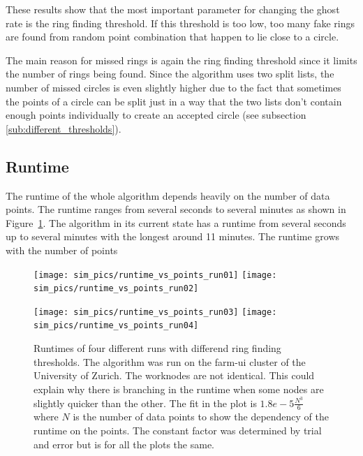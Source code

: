 \documentclass[11pt]{scrreprt}
\begin{document}
These results show that the most important parameter for changing the ghost rate is the ring finding threshold.
If this threshold is too low, too many fake rings are found from random point combination that happen to lie close to a circle.

The main reason for missed rings is again the ring finding threshold since it limits the number of rings
being found. Since the algorithm uses two split lists, the number of missed circles is even slightly higher due to the
fact that sometimes the points of a circle can be split just in a way that the two lists don't
contain enough points individually to create an accepted circle (see subsection \ref{sub:different_thresholds}).
\subsection{Runtime} %
\label{sub:runtime}

The runtime of the whole algorithm depends heavily on the number of data points. The runtime ranges from several seconds to 
several minutes as shown in Figure~\ref{fig:runtime}. The algorithm in its current state has a runtime from several seconds up
to several minutes with the longest around 11 minutes. The runtime grows with the number of points

\begin{figure}[tb]
  \centering
  \texttt{[image: sim\_pics/runtime\_vs\_points\_run01]}%
  \texttt{[image: sim\_pics/runtime\_vs\_points\_run02]}

  \texttt{[image: sim\_pics/runtime\_vs\_points\_run03]}%
  \texttt{[image: sim\_pics/runtime\_vs\_points\_run04]}
  \caption[Runtimes of four different runs]{Runtimes of four different runs with differend ring finding thresholds. The algorithm was run on the farm-ui cluster of the
  University of Zurich. The worknodes are not identical. This could explain why there is branching in the runtime when some 
  nodes are slightly quicker than the other. The fit in the plot is $1.8e{-}5\frac{N^3}{6}$ where $N$ is the number of data points
  to show the dependency of the runtime on the points. The constant factor was determined by trial and error but is for all the plots
  the same.}
  \label{fig:runtime}
\end{figure}

\end{document}
